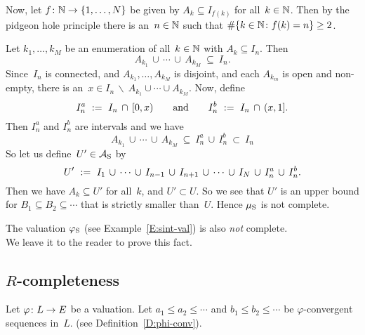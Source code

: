 \documentclass[main.tex]{subfiles}
\begin{document}
\begin{ex}
Now, let $f\colon \mathbb{N} \rightarrow \{ 1, \dotsc, N \}$
be given by $A_k \subseteq I_{f(k)}$ for all~$k\in \mathbb{N}$.
Then by the pidgeon hole principle
there is an~$n\in\mathbb{N}$ such that $\#\{k\in\mathbb{N}\colon f(k)=n\} \geq 2$.

Let $k_1,\dotsc,k_M$
be an enumeration of all~$k\in\mathbb{N}$ with $A_k\subseteq I_n$.
Then 
\begin{equation*}
A_{k_1} \,\cup\, \dotsb \,\cup\, A_{k_M} \ \subseteq \ I_n.
\end{equation*}
Since~$I_n$ is connected, and  $A_{k_1},\dotsc,A_{k_M}$
is disjoint,
and each $A_{k_m}$ is open and non-empty,
there is an~$x\in I_n \,\backslash\  A_{k_1}\cup\dotsb\cup A_{k_M}$.
Now, define
\begin{equation*}
I^a_n \ :=\  I_n \,\cap\, [0,x)
\qquad\text{and}\qquad
I^b_n \ :=\  I_n \,\cap\, (x,1].
\end{equation*}
Then $I^a_n$ and $I^b_n$ are intervals
and we have
\begin{equation*}
A_{k_1} \,\cup\,\dotsb\,\cup\, A_{k_M}
\ \subseteq\ 
I^a_n \,\cup\, I^b_n
\ \subset \ I_n
\end{equation*}
So let us define~$U'\in\mathcal{A}_{\mathrm{S}}$ by 
\begin{equation*}
U'\ \eqdf\ 
I_1 \,\cup\,\dotsb \,\cup\, I_{n-1} \,\cup\,
I_{n+1} \,\cup\, \dotsb \,\cup\, I_N\,\cup\,I^a_n\,\cup\,I^b_n.
\end{equation*}
Then we have $A_k \subseteq U'$ for all~$k$,
and $U'\subset U$.
So we see that $U'$ is an upper bound for $B_1\subseteq B_2 \subseteq\dotsb$
that is strictly smaller than~$U$.
Hence $\mu_{\mathrm{S}}$ is not complete.
\end{ex}
%
%
\begin{ex}
The valuation $\varphi_{\mathrm{S}}$ 
(see Example~\ref{E:sint-val}) is also \emph{not} complete.\\
We leave it to the reader to prove this fact.
\end{ex}



%
\subsection{$R$-completeness}
\label{SS:complete-val_R-completeness}
Let $\varphi\colon L \rightarrow E$ be a valuation.
Let $a_1 \leq a_2 \leq \dotsb$
and $b_1 \leq b_2 \leq \dotsb$ be $\varphi$-convergent sequences in~$L$.
(see Definition~\ref{D:phi-conv}).
\end{document}
